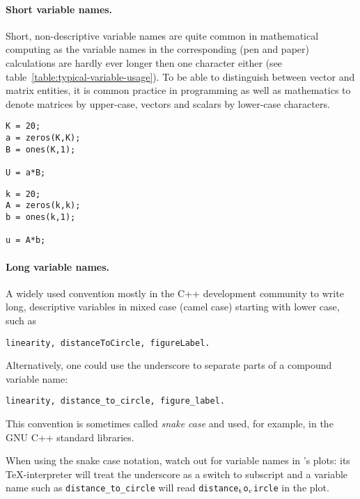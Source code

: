 \paragraph{Short variable names.}
Short, non-descriptive variable names are quite common in mathematical
computing as the variable names in the corresponding (pen and paper)
calculations are hardly ever longer then one character either (see
table~\ref{table:typical-variable-usage}). To be able to distinguish between
vector and matrix entities, it is common practice in programming as well as
mathematics to denote matrices by upper-case, vectors and scalars by lower-case
characters.

\hfill
\begin{minipage}[t]{.45\textwidth}
\begin{lstlisting}[framerule=2pt,rulecolor=\color{badred}]
K = 20;
a = zeros(K,K);
B = ones(K,1);

U = a*B;
\end{lstlisting}
\end{minipage}
\hfill
\begin{minipage}[t]{.45\textwidth}
\begin{lstlisting}[framerule=2pt,rulecolor=\color{goodgreen}]
k = 20;
A = zeros(k,k);
b = ones(k,1);

u = A*b;
\end{lstlisting}
\end{minipage}
\hfill


\paragraph{Long variable names.}
A widely used convention mostly in the C++ development community to write
long, descriptive variables in mixed case (camel case) starting with lower
case, such as
\begin{lstlisting}
linearity, distanceToCircle, figureLabel.
\end{lstlisting}
Alternatively, one could use the underscore to separate parts of a compound
variable name:
\begin{lstlisting}
linearity, distance_to_circle, figure_label.
\end{lstlisting}
This convention is sometimes called \emph{snake case} and used, for example,
in the GNU C++ standard libraries.


When using the snake case notation, watch out for variable names in
\matlab{}'s plots: its \TeX-interpreter will treat the underscore as a switch
to subscript and a variable name such as \lstinline!distance_to_circle! will
read
\lstinline!distance!$_{\text{\lstinline!t!}}$\lstinline!o!$_{\text{\lstinline!c!}}$\lstinline!ircle!
in the plot.

